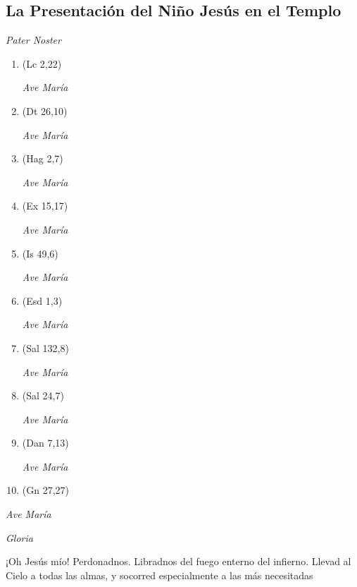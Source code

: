 \documentclass[a4paper,11pt, oneside]{report}
\begin{document}
      \subsection*{La Presentación del Niño Jesús en el Templo}
      
        \textit{Pater Noster}

        \begin{enumerate}
          
          \item (Lc 2,22)
          
          \textit{Ave María}

          \item (Dt 26,10)
          
          \textit{Ave María}

          \item (Hag 2,7)
          
          \textit{Ave María}

          \item (Ex 15,17)
          
          \textit{Ave María}

          \item (Is 49,6)

          \textit{Ave María}

          \item (Esd 1,3)
          
          \textit{Ave María}

          \item (Sal 132,8)
          
          \textit{Ave María}

          \item (Sal 24,7)
          
          \textit{Ave María}

          \item (Dan 7,13)
          
          \textit{Ave María}

          \item (Gn 27,27)

        \end{enumerate}

        \textit{Ave María} \par
        \indent\textit{Gloria} \par
        \indent¡Oh Jesús mío! Perdonadnos. Libradnos del fuego enterno del infierno. Llevad al Cielo a todas las almas, y socorred especialmente a las más 
        necesitadas
            
\end{document}
